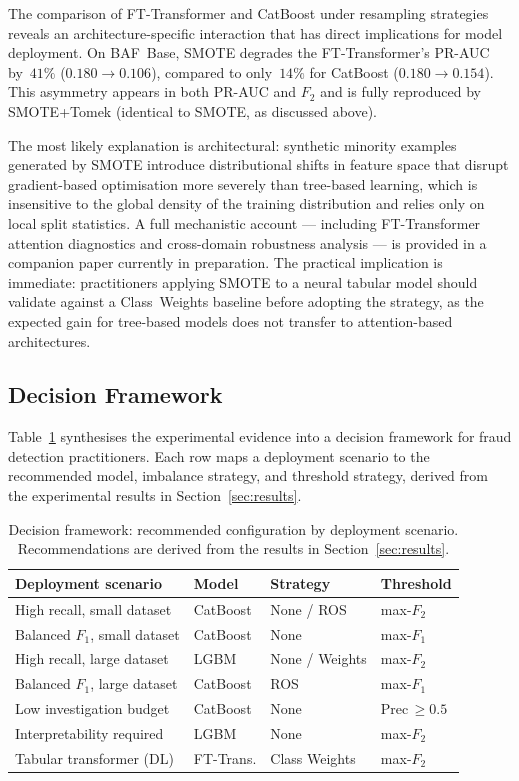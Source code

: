 \documentclass[a4paper,fleqn]{cas-sc}
\begin{document}
The comparison of FT-Transformer and CatBoost under resampling strategies reveals an
architecture-specific interaction that has direct implications for model deployment.
On BAF~Base, SMOTE degrades the FT-Transformer's PR-AUC by~$41\%$
($0.180\!\to\!0.106$), compared to only~$14\%$ for CatBoost ($0.180\!\to\!0.154$).
This asymmetry appears in both PR-AUC and $F_2$ and is fully reproduced by SMOTE+Tomek
(identical to SMOTE, as discussed above).

The most likely explanation is architectural: synthetic minority examples generated by
SMOTE introduce distributional shifts in feature space that disrupt gradient-based
optimisation more severely than tree-based learning, which is insensitive to the global
density of the training distribution and relies only on local split statistics.
A full mechanistic account --- including FT-Transformer attention diagnostics and
cross-domain robustness analysis --- is provided in a companion paper currently in
preparation.
The practical implication is immediate: practitioners applying SMOTE to a neural tabular
model should validate against a Class~Weights baseline before adopting the strategy, as
the expected gain for tree-based models does not transfer to attention-based architectures.

\subsection{Decision Framework}
\label{subsec:disc_framework}

Table~\ref{tab:decision_framework} synthesises the experimental evidence into a
decision framework for fraud detection practitioners.
Each row maps a deployment scenario to the recommended model, imbalance strategy, and
threshold strategy, derived from the experimental results in Section~\ref{sec:results}.

\begin{table}[ht!]
\centering
\caption{Decision framework: recommended configuration by deployment scenario.
  Recommendations are derived from the results in Section~\ref{sec:results}.}
\label{tab:decision_framework}
\begin{tabular}{p{3.8cm} l l l}
\toprule
Deployment scenario & Model & Strategy & Threshold \\
\midrule
High recall, small dataset   & CatBoost  & None / ROS     & max-$F_2$      \\
Balanced $F_1$, small dataset & CatBoost  & None          & max-$F_1$      \\
High recall, large dataset   & LGBM      & None / Weights & max-$F_2$      \\
Balanced $F_1$, large dataset & CatBoost  & ROS           & max-$F_1$      \\
Low investigation budget     & CatBoost  & None           & Prec\,$\geq\!0.5$ \\
Interpretability required    & LGBM      & None           & max-$F_2$      \\
Tabular transformer (DL)     & FT-Trans. & Class Weights  & max-$F_2$      \\
\bottomrule
\end{tabular}
\end{table}
\end{document}
